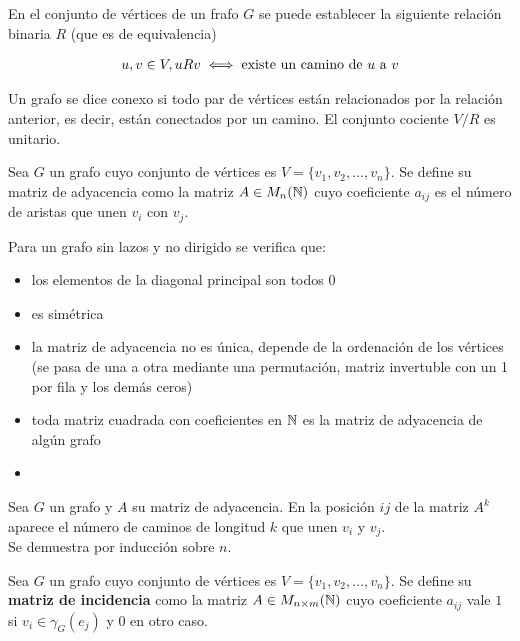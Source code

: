En el conjunto de vértices de un frafo $G$ se puede establecer la siguiente relación binaria $R$ (que es de equivalencia)

\begin{align*}
    u,v\in V, uRv \iff \text{existe un camino de $u$ a $v$}
\end{align*}

\begin{definicion}
    Un grafo se dice conexo si todo par de vértices están relacionados por la relación anterior, es decir, están conectados por un camino. El conjunto cociente $V/R$ es unitario.
\end{definicion}

\begin{definicion}
    Sea $G$ un grafo cuyo conjunto de vértices es $V=\{v_1,v_2,\dots,v_n\}$. Se define su matriz de adyacencia como la matriz $A\in M_n(\mathbb{N})$ cuyo coeficiente $a_{ij}$ es el número de aristas que unen $v_i$ con $v_j$.
\end{definicion}

\begin{propiedades}
    Para un grafo sin lazos y no dirigido se verifica que:
    \begin{itemize}
        \item los elementos de la diagonal principal son todos 0
        \item es simétrica
        \item la matriz de adyacencia no es única, depende de la ordenación de los vértices (se pasa de una a otra mediante una permutación, matriz invertuble con un 1 por fila y los demás ceros)
        \item toda matriz cuadrada con coeficientes en $\mathbb{N}$ es la matriz de adyacencia de algún grafo
        \item %
    \end{itemize}
\end{propiedades}

\begin{teo}
    Sea $G$ un grafo y $A$ su matriz de adyacencia. En la posición $ij$ de la matriz $A^k$ aparece el número de caminos de longitud $k$ que unen $v_i$ y $v_j$.\\

    Se demuestra por inducción sobre $n$.
\end{teo}

\begin{definicion}
    Sea $G$ un grafo cuyo conjunto de vértices es $V=\{v_1,v_2,\dots,v_n\}$. Se define su \textbf{matriz de incidencia} como la matriz $A\in M_{n\times m}(\mathbb{N})$ cuyo coeficiente $a_{ij}$ vale $1$ si $v_i\in \gamma_G(e_j)$ y $0$ en otro caso. 
\end{definicion}

